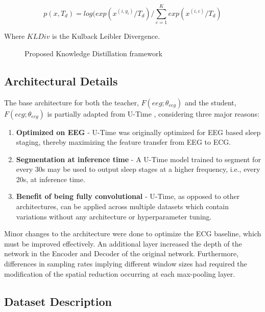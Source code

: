 \documentclass[letterpaper, 10 pt, conference]{ieeeconf}
\begin{document}
\begin{equation} \label{eq:7}
p(x,T_d) = log(exp(x^{(i,y_i)}/T_d) / \sum_{c=1}^{K}  exp(x^{(i,c)}/T_d)
\end{equation}

Where $KLDiv$ is the Kulback Leibler Divergence.

\begin{figure}[t]
    \centering
    
    \caption{Proposed Knowledge Distillation framework}
    \label{fig:1}
\vspace{-1.2em}
\end{figure}

\subsection{Architectural Details}

The base architecture for both the teacher, $F(eeg; \theta_{eeg})$ and the student, $F(ecg; \theta_{ecg})$ is partially adapted from U-Time \cite{perslev2019u}, considering three major reasons:
\begin{enumerate}
    \item  \textbf{Optimized on EEG} - U-Time was originally optimized for EEG based sleep staging, thereby maximizing the feature transfer from EEG to ECG.
    \item  \textbf{Segmentation at inference time} - A U-Time model trained to segment for every 30s may be used to output sleep stages at a higher frequency, i.e., every 20s, at inference time.
   \item \textbf{Benefit of being fully convolutional} - U-Time, as opposed to other architectures, can be applied across multiple datasets which contain variations without any architecture or hyperparameter tuning.
\end{enumerate}

Minor changes to the architecture were done to optimize the ECG baseline, which must be improved effectively. An additional layer increased the depth of the network in the Encoder and Decoder of the original network. Furthermore, differences in sampling rates implying different window sizes had required the modification of the spatial reduction occurring at each max-pooling layer. 

\subsection{Dataset Description}
\end{document}
